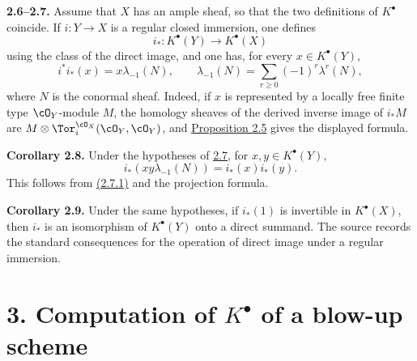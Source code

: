 \textbf{2.6--2.7.} Assume that \(X\) has an ample sheaf, so that the two definitions of \(K^\bullet\) coincide. If \(i:Y\to X\) is a regular closed immersion, one defines
\[
i_*:K^\bullet(Y)\to K^\bullet(X)
\]
using the class of the direct image, and one has, for every \(x\in K^\bullet(Y)\),
\begin{equation}\tag{2.7.1}
i^*i_*(x)=x\lambda_{-1}(N),
\qquad
\lambda_{-1}(N)=\sum_{r\ge0}(-1)^r\lambda^r(N),
\end{equation}
where \(N\) is the conormal sheaf. Indeed, if \(x\) is represented by a locally free finite type \(\cO_Y\)-module \(M\), the homology sheaves of the derived inverse image of \(i_*M\) are \(M\otimes\Tor_i^{\cO_X}(\cO_Y,\cO_Y)\), and \hyperlink{sga6.e07.prop.2-5}{Proposition 2.5} gives the displayed formula.

\textbf{Corollary 2.8.} Under the hypotheses of \hyperlink{sga6.e07.para.2-6}{2.7}, for \(x,y\in K^\bullet(Y)\),
\begin{equation}\tag{2.8.1}
i_*(xy\lambda_{-1}(N))=i_*(x)i_*(y).
\end{equation}
This follows from \hyperlink{sga6.e07.eq.2-7-1}{(2.7.1)} and the projection formula.

\textbf{Corollary 2.9.} Under the same hypotheses, if \(i_*(1)\) is invertible in \(K^\bullet(X)\), then \(i_*\) is an isomorphism of \(K^\bullet(Y)\) onto a direct summand. The source records the standard consequences for the operation of direct image under a regular immersion.

\section*{3. Computation of \texorpdfstring{$K^\bullet$}{K} of a blow-up scheme}

